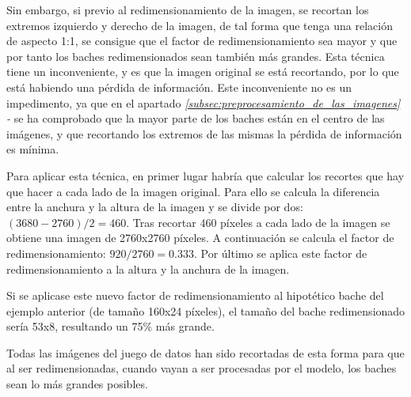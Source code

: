 Sin embargo, si previo al redimensionamiento de la imagen, se recortan los extremos izquierdo y derecho de la imagen, de tal forma que tenga una relación de aspecto 1:1, se consigue que el factor de redimensionamiento sea mayor y que por tanto los baches redimensionados sean también más grandes. Esta técnica tiene un inconveniente, y es que la imagen original se está recortando, por lo que está habiendo una pérdida de información. Este inconveniente no es un impedimento, ya que en el apartado \textit{\ref{subsec:preprocesamiento_de_las_imagenes} - } se ha comprobado que la mayor parte de los baches están en el centro de las imágenes, y que recortando los extremos de las mismas la pérdida de información es mínima.

Para aplicar esta técnica, en primer lugar habría que calcular los recortes que hay que hacer a cada lado de la imagen original. Para ello se calcula la diferencia entre la anchura y la altura de la imagen y se divide por dos: $(3680 - 2760) / 2 = 460$. Tras recortar 460 píxeles a cada lado de la imagen se obtiene una imagen de 2760x2760 píxeles. A continuación se calcula el factor de redimensionamiento: $920 / 2760 = 0.333$. Por último se aplica este factor de redimensionamiento a la altura y la anchura de la imagen.

Si se aplicase este nuevo factor de redimensionamiento al hipotético bache del ejemplo anterior (de tamaño 160x24 píxeles), el tamaño del bache redimensionado sería 53x8, resultando un 75\% más grande.

Todas las imágenes del juego de datos han sido recortadas de esta forma para que al ser redimensionadas, cuando vayan a ser procesadas por el modelo, los baches sean lo más grandes posibles.